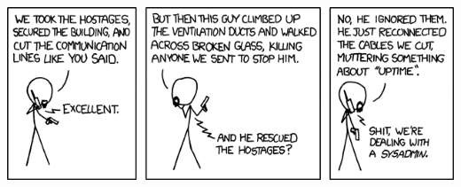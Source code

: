 \author[1]{Christoph Weißenborn}
\author[1]{Jörg Ricardo Schumacher}
\author[1]{Marc Ernst Eddy Woerkom}
\author[1]{Patrick Häbel}
\author[2]{Sascha Girrulat}
\author[2]{Silas Jansen}
\author[1]{Waldemar Schmidt}
\date{} %





\maketitle

\vfill
\begin{center}
\includegraphics[scale=0.5]{images/0705.png} 
\end{center}



\newpage
\tableofcontents
\newpage


